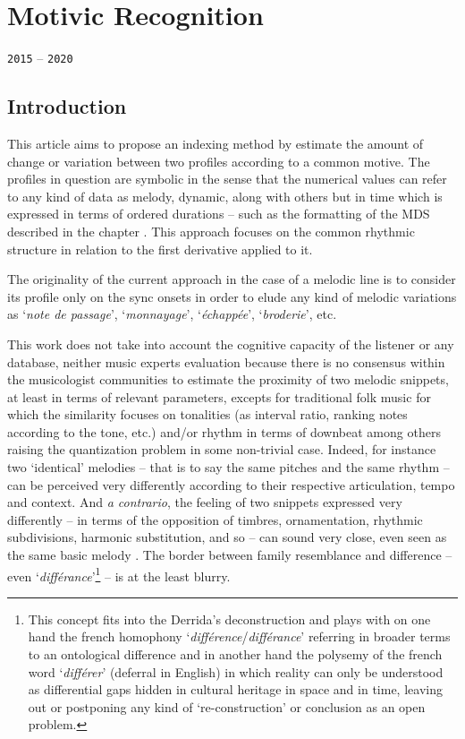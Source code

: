 \chapter{Motivic Recognition}
\thispagestyle{empty}

\label{motrec}
{\texttt{2015} -- \texttt{2020}}

\bigskip
\smallskip

\section{Introduction}
This article aims to propose an indexing method by estimate the amount of change or variation between two profiles according to a common motive. The profiles in question are symbolic in the sense that the numerical values can refer to any kind of data as melody, dynamic, along with others but in time which is expressed in terms of ordered durations -- such as the formatting of the MDS described in the chapter \textsl{}. This approach focuses on the common rhythmic structure in relation to the first derivative applied to it.

The originality of the current approach in the case of a melodic line is to consider its profile only on the sync onsets in order to elude any kind of melodic variations as `\textit{note de passage}', `\textit{monnayage}', `\textit{\'{e}chapp\'{e}e}', `\textit{broderie}', etc.

\bigskip

This work does not take into account the cognitive capacity of the listener or any database, neither music experts evaluation because there is no consensus within the musicologist communities to estimate the proximity of two melodic snippets, at least in terms of relevant parameters, excepts for traditional folk music for which the similarity focuses on tonalities (as interval ratio, ranking notes according to the tone, etc.) and/or rhythm in terms of downbeat among others raising the quantization problem \citep{desqz} in some non-trivial case. Indeed, for instance two `identical' melodies -- that is to say the same pitches and the same rhythm -- can be perceived very differently according to their respective articulation, tempo and context. And \textit{a contrario}, the feeling of two snippets expressed very differently -- in terms of the opposition of timbres, ornamentation, rhythmic subdivisions, harmonic substitution, and so -- can sound very close, even seen as the same basic melody \citep{hfra}. The border between family resemblance and difference -- even `\textit{diff\'{e}rance}'\citep{dlg}\footnote{This concept fits into the Derrida's deconstruction and plays with on one hand the french homophony `\textit{diff\'{e}rence}/\textit{diff\'{e}rance}' referring in broader terms to an ontological difference and in another hand the polysemy of the french word `\textit{diff\'{e}rer}' (deferral in English) in which reality can only be understood as differential gaps hidden in cultural heritage in space and in time, leaving out or postponing any kind of `re-construction' or conclusion as an open problem.} -- is at the least blurry.

